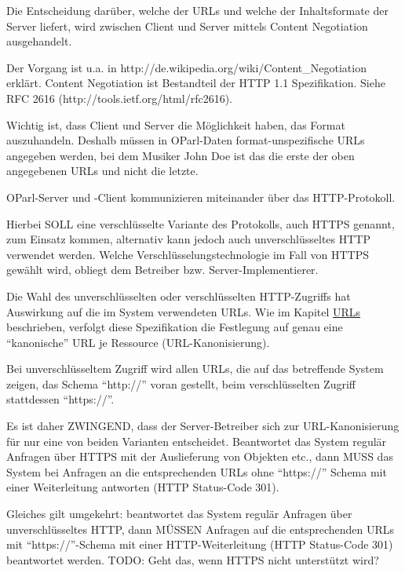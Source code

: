 \documentclass[,a4paper]{article}
\begin{document}
Die Entscheidung darüber, welche der URLs und welche der Inhaltsformate
der Server liefert, wird zwischen Client und Server mittels Content
Negotiation ausgehandelt.

Der Vorgang ist u.a. in
http://de.wikipedia.org/wiki/Content\_Negotiation erklärt. Content
Negotiation ist Bestandteil der HTTP 1.1 Spezifikation. Siehe RFC 2616
(http://tools.ietf.org/html/rfc2616).

Wichtig ist, dass Client und Server die Möglichkeit haben, das Format
auszuhandeln. Deshalb müssen in OParl-Daten format-unspezifische URLs
angegeben werden, bei dem Musiker John Doe ist das die erste der oben
angegebenen URLs und nicht die letzte.


OParl-Server und -Client kommunizieren miteinander über das
HTTP-Protokoll.

Hierbei SOLL eine verschlüsselte Variante des Protokolls, auch HTTPS
genannt, zum Einsatz kommen, alternativ kann jedoch auch
unverschlüsseltes HTTP verwendet werden. Welche
Verschlüsselungstechnologie im Fall von HTTPS gewählt wird, obliegt dem
Betreiber bzw. Server-Implementierer.

Die Wahl des unverschlüsselten oder verschlüsselten HTTP-Zugriffs hat
Auswirkung auf die im System verwendeten URLs. Wie im Kapitel
\hyperref[urls]{URLs} beschrieben, verfolgt diese Spezifikation die
Festlegung auf genau eine ``kanonische'' URL je Ressource
(URL-Kanonisierung).

Bei unverschlüsseltem Zugriff wird allen URLs, die auf das betreffende
System zeigen, das Schema ``http://'' voran gestellt, beim
verschlüsselten Zugriff stattdessen ``https://''.

Es ist daher ZWINGEND, dass der Server-Betreiber sich zur
URL-Kanonisierung für nur eine von beiden Varianten entscheidet.
Beantwortet das System regulär Anfragen über HTTPS mit der Auslieferung
von Objekten etc., dann MUSS das System bei Anfragen an die
entsprechenden URLs ohne ``https://'' Schema mit einer Weiterleitung
antworten (HTTP Status-Code 301).

Gleiches gilt umgekehrt: beantwortet das System regulär Anfragen über
unverschlüsseltes HTTP, dann MÜSSEN Anfragen auf die entsprechenden URLs
mit ``https://''-Schema mit einer HTTP-Weiterleitung (HTTP Status-Code
301) beantwortet werden. TODO: Geht das, wenn HTTPS nicht unterstützt
wird?
\end{document}
